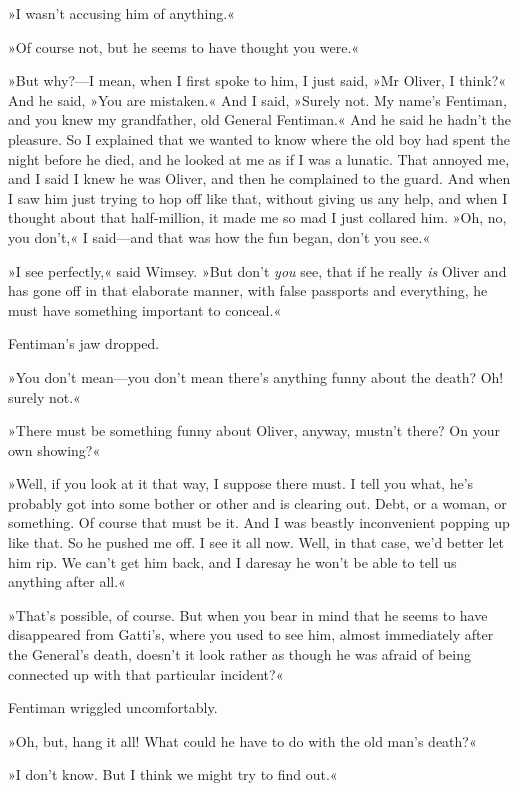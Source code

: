 »I wasn't accusing him of anything.«

»Of course not, but he seems to have thought you were.«

»But why?---I mean, when I first spoke to him, I just said, »Mr Oliver, I think?« And he said, »You are mistaken.« And I said, »Surely not. My name's Fentiman, and you knew my grandfather, old General Fentiman.« And he said he hadn't the pleasure. So I explained that we wanted to know where the old boy had spent the night before he died, and he looked at me as if I was a lunatic. That annoyed me, and I said I knew he was Oliver, and then he complained to the guard. And when I saw him just trying to hop off like that, without giving us any help, and when I thought about that half-million, it made me so mad I just collared him. »Oh, no, you don't,« I said\allowbreak---\allowbreak and that was how the fun began, don't you see.«

»I see perfectly,« said Wimsey. »But don't \textit{you} see, that if he really \textit{is} Oliver and has gone off in that elaborate manner, with false passports and everything, he must have something important to conceal.«

Fentiman's jaw dropped.

»You don't mean\allowbreak---\allowbreak you don't mean there's anything funny about the death? Oh! surely not.«

»There must be something funny about Oliver, anyway, mustn't there? On your own showing?«

»Well, if you look at it that way, I suppose there must. I tell you what, he's probably got into some bother or other and is clearing out. Debt, or a woman, or something. Of course that must be it. And I was beastly inconvenient popping up like that. So he pushed me off. I see it all now. Well, in that case, we'd better let him rip. We can't get him back, and I daresay he won't be able to tell us anything after all.«

»That's possible, of course. But when you bear in mind that he seems to have disappeared from Gatti's, where you used to see him, almost immediately after the General's death, doesn't it look rather as though he was afraid of being connected up with that particular incident?«

Fentiman wriggled uncomfortably.

»Oh, but, hang it all! What could he have to do with the old man's death?«

»I don't know. But I think we might try to find out.«

